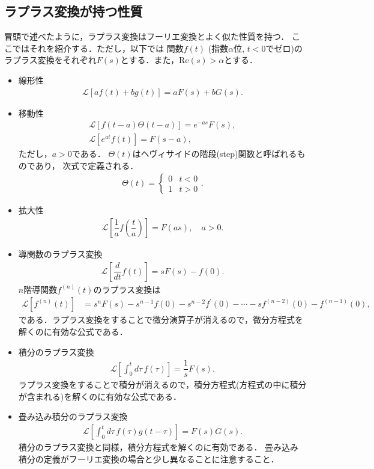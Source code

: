 \subsection{ラプラス変換が持つ性質}
%
冒頭で述べたように，ラプラス変換はフーリエ変換とよく似た性質を持つ．
ここではそれを紹介する．ただし，以下では
関数$f(t)$ (指数$\alpha$位, $t<0$でゼロ)のラプラス変換をそれぞれ$F(s)$とする．また，$\mathrm{Re}(s)>\alpha$とする．
%
\begin{itemize}
  \item 線形性
	\begin{align}
	  \mathcal{L}\left[af(t)+bg(t)\right] = aF(s) + bG(s).
	  \label{laplace_linear}
	\end{align}
  \item 移動性
	\begin{align}
          \mathcal{L}\left[f(t-a)\Theta(t-a)\right] = e^{-as}F(s), \label{laplace_shift01}\\
          \mathcal{L}\left[e^{at}f(t)\right]   = F(s-a),           \label{laplace_shift02}
	\end{align}
	ただし，$a>0$である．
	$\Theta(t)$はヘヴィサイドの階段(step)関数と呼ばれるものであり，
	次式で定義される．
	\begin{align}
	  \Theta(t) = 
	  \begin{cases}
	    0 & t < 0 \\
            1 & t > 0 
	  \end{cases}.
	\end{align}
  \item 拡大性
	\begin{align}
	  \mathcal{L}\left[\dfrac{1}{a}f\left(\dfrac{t}{a}\right)\right] = F(as), \quad a > 0. 
	\end{align}
  \item 導関数のラプラス変換
	\begin{align}
	  \mathcal{L}\left[\dfrac{d}{dt}f(t)\right] = sF(s) - f(0). \label{laplace_diff0} 
	\end{align}
	$n$階導関数$f^{(n)}(t)$のラプラス変換は
	\begin{align}
	  \mathcal{L}\left[f^{(n)}(t)\right] 
          &= s^n F(s) - s^{n-1}f(0) - s^{n-2}f^{\prime}(0) -\cdots - s f^{(n-2)}(0) - f^{(n-1)}(0), \label{laplace_diff1}
	\end{align}
	である．ラプラス変換をすることで微分演算子が消えるので，微分方程式を解くのに有効な公式である．
  \item 積分のラプラス変換
	\begin{align}
          \mathcal{L}\left[\int_{0}^{t}d\tau\,f(\tau)\right] = \dfrac{1}{s}F(s). \label{laplace_integrate}
	\end{align}
	ラプラス変換をすることで積分が消えるので，積分方程式(方程式の中に積分が含まれる)を解くのに有効な公式である．
  \item 畳み込み積分のラプラス変換
	\begin{align}
	  \mathcal{L}\left[\int_{0}^{t}d\tau\,f(\tau)g(t-\tau)\right] = F(s)G(s). 
	\end{align}
	積分のラプラス変換と同様，積分方程式を解くのに有効である．
	畳み込み積分の定義がフーリエ変換の場合と少し異なることに注意すること．
\end{itemize}
%
